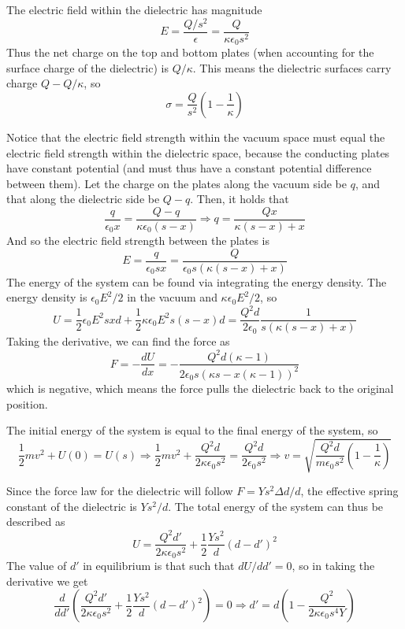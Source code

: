 \documentclass[11pt]{scrartcl}
\begin{document}
\begin{sol}
    \begin{anum}
        \item The electric field within the dielectric has magnitude $$E=\frac{Q/s^2}{\epsilon}=\frac{Q}{\kappa \epsilon_0 s^2}$$Thus the net charge on the top and bottom plates (when accounting for the surface charge of the dielectric) is $Q/\kappa$. This means the dielectric surfaces carry charge $Q-Q/\kappa$, so $$\sigma=\boxed{\frac{Q}{s^2}\left(1-\frac1\kappa\right)}$$
        \item Notice that the electric field strength within the vacuum space must equal the electric field strength within the dielectric space, because the conducting plates have constant potential (and must thus have a constant potential difference between them). Let the charge on the plates along the vacuum side be $q$, and that along the dielectric side be $Q-q$. Then, it holds that $$\frac{q}{\epsilon_0x}=\frac{Q-q}{\kappa\epsilon_0(s-x)}\Rightarrow q=\frac{Qx}{\kappa(s-x)+x}$$And so the electric field strength between the plates is $$E=\frac{q}{\epsilon_0sx}=\frac{Q}{\epsilon_0s(\kappa(s-x)+x)}$$
        The energy of the system can be found via integrating the energy density. The energy density is $\epsilon_0E^2/2$ in the vacuum and $\kappa \epsilon_0E^2/2$, so $$U=\frac 12{\epsilon_0 E^2}sxd+\frac 12{\kappa \epsilon_0 E^2}s(s-x)d=\frac{Q^2d}{2\epsilon_0}\frac{1}{s(\kappa(s-x)+x)}$$Taking the derivative, we can find the force as $$F=-\frac{dU}{dx}=\boxed{-\frac{Q^2d(\kappa -1)}{2\epsilon_0s(\kappa s-x(\kappa-1))^2}}$$which is negative, which means the force pulls the dielectric back to the original position. 
        \item The initial energy of the system is equal to the final energy of the system, so $$\frac12mv^2+U(0)=U(s)\Rightarrow \frac12mv^2+\frac{Q^2d}{2\kappa\epsilon_0s^2}=\frac{Q^2d}{2\epsilon_0s^2}\Rightarrow v=\boxed{\sqrt{\frac{Q^2d}{m\epsilon_0s^2}\left(1-\frac1{\kappa }\right)}} $$
        \item Since the force law for the dielectric will follow $F=Ys^2\Delta d/d$, the effective spring constant of the dielectric is $Ys^2/d$. The total energy of the system can thus be described as $$U=\frac{Q^2d'}{2\kappa \epsilon_0s^2}+\frac12\frac{Ys^2}{d}(d-d')^2$$The value of $d'$ in equilibrium is that such that $dU/dd'=0$, so in taking the derivative we get $$\frac{d}{dd'}\left(\frac{Q^2d'}{2\kappa \epsilon_0s^2}+\frac12\frac{Ys^2}{d}(d-d')^2\right)=0\Rightarrow d'=\boxed{d\left(1-\frac{Q^2}{2\kappa\epsilon_0s^4Y}\right)}$$
    \end{anum}
\end{sol}
\end{document}
